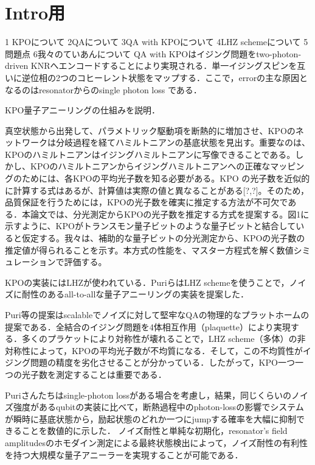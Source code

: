 \section{Intro用}
1 KPOについて
2QAについて
3QA with KPOについて
4LHZ schemeについて
5問題点
6我々のていあんについて
QA with KPOはイジング問題をtwo-photon-driven KNRへエンコードすることにより実現される．単一イジングスピンを互いに逆位相の2つのコヒーレント状態をマップする．ここで，errorの主な原因となるのはresonatorからのsingle photon loss である．

KPO量子アニーリングの仕組みを説明．

真空状態から出発して、パラメトリック駆動項を断熱的に増加させ、KPOのネットワークは分岐過程を経てハミルトニアンの基底状態を見出す。重要なのは、KPOのハミルトニアンはイジングハミルトニアンに写像できることである。しかし、KPOのハミルトニアンからイジングハミルトニアンへの正確なマッピングのためには、各KPOの平均光子数を知る必要がある。KPO の光子数を近似的に計算する式はあるが、計算値は実際の値と異なることがある[?,?]。そのため，品質保証を行うためには，KPOの光子数を確実に推定する方法が不可欠である．本論文では、分光測定からKPOの光子数を推定する方式を提案する。図1に示すように、KPOがトランスモン量子ビットのような量子ビットと結合していると仮定する。我々は、補助的な量子ビットの分光測定から、KPOの光子数の推定値が得られることを示す。本方式の性能を、マスター方程式を解く数値シミュレーションで評価する。


KPOの実装にはLHZが使われている．PuriらはLHZ schemeを使うことで，ノイズに耐性のあるall-to-allな量子アニーリングの実装を提案した．



Puri等の提案はscalableでノイズに対して堅牢なQAの物理的なプラットホームの提案である．全結合のイジング問題を4体相互作用（plaquette）により実現する．多くのプラケットにより対称性が壊れることで，LHZ scheme（多体）の非対称性によって，KPOの平均光子数が不均質になる．そして，この不均質性がイジング問題の精度を劣化させることが分かっている．したがって，KPO一つ一つの光子数を測定することは重要である．


Puriさんたちはsingle-photon lossがある場合を考慮し，結果，同じくらいのノイズ強度があるqubitの実装に比べて，断熱過程中のphoton-lossの影響でシステムが瞬時に基底状態から，励起状態のどれか一つにjumpする確率を大幅に抑制できることを数値的に示した．
ノイズ耐性と単純な初期化，resonator's field amplitudesのホモダイン測定による最終状態検出によって，ノイズ耐性の有利性を持つ大規模な量子アニーラーを実現することが可能である．

